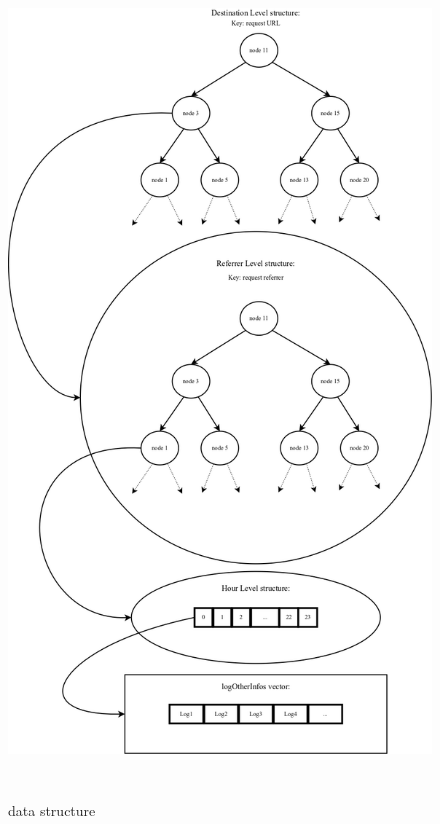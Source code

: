 \documentclass[a4paper, 12pts]{article}
\begin{document}
\begin{figure}[t]
	\caption{data structure}
	\includegraphics[height=22cm]{../diagrammes/dataStruct/dataStruct.png}
\end{figure}
\end{document}
